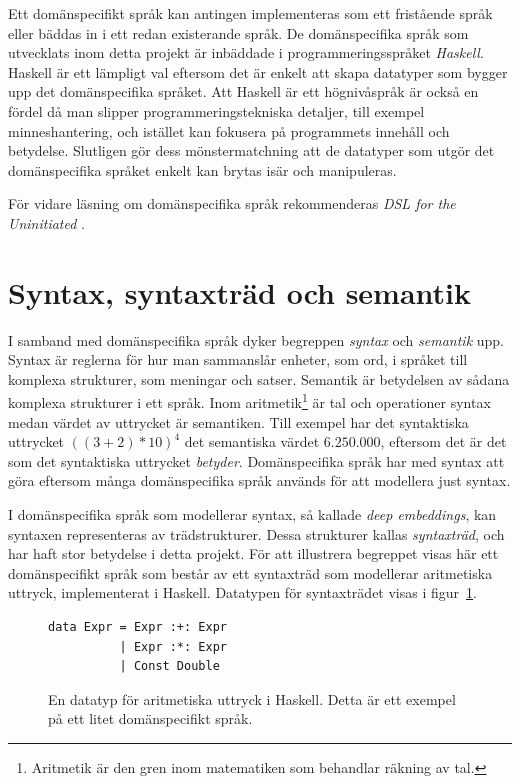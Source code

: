Ett domänspecifikt språk kan antingen implementeras som ett fristående språk
eller bäddas in i ett redan existerande språk. De domänspecifika språk som
utvecklats inom detta projekt är inbäddade i programmeringsspråket
\textit{Haskell}. Haskell är ett lämpligt val eftersom det är enkelt att skapa
datatyper som bygger upp det domänspecifika språket. Att Haskell är ett
högnivåspråk är också en fördel då man slipper programmeringstekniska detaljer,
till exempel minneshantering, och istället kan fokusera på programmets innehåll
och betydelse. Slutligen gör dess mönstermatchning att de datatyper som utgör
det domänspecifika språket enkelt kan brytas isär och manipuleras.

För vidare läsning om domänspecifika språk rekommenderas \textit{DSL for the Uninitiated} \cite{DSLU}. 

\section{Syntax, syntaxträd och semantik}\label{sec:syntax}

I samband med domänspecifika språk dyker begreppen \textit{syntax} och
\textit{semantik} upp. Syntax är reglerna för hur man sammanslår
enheter, som ord, i språket till komplexa strukturer, som meningar och
satser. Semantik är betydelsen av sådana komplexa strukturer i ett språk.
Inom aritmetik\footnote{Aritmetik är
  den gren inom matematiken som behandlar räkning av tal.} är tal och
operationer syntax medan värdet av uttrycket är semantiken.  Till
exempel har det syntaktiska uttrycket $((3 + 2) * 10)^4$ det semantiska värdet $6.250.000$,
eftersom det är det som det syntaktiska uttrycket \textit{betyder}.
Domänspecifika språk har med syntax att göra eftersom många
domänspecifika språk används för att modellera just syntax.

I domänspecifika språk som modellerar syntax, så kallade \textit{deep
embeddings}, kan syntaxen representeras av trädstrukturer. Dessa
strukturer kallas \textit{syntaxträd}, och har haft stor betydelse i detta projekt.
För att illustrera begreppet visas här ett domänspecifikt språk som består av ett
syntaxträd som modellerar aritmetiska uttryck, implementerat i Haskell.
Datatypen för syntaxträdet visas i figur~\ref{fig:syntax_exempel}.

\begin{figure}[tph]
  \begin{lstlisting}
data Expr = Expr :+: Expr
          | Expr :*: Expr
          | Const Double
  \end{lstlisting}
  \caption{En datatyp för aritmetiska uttryck i Haskell. Detta är ett exempel på
           ett litet domänspecifikt språk.}\label{fig:syntax_exempel} 
\end{figure}

